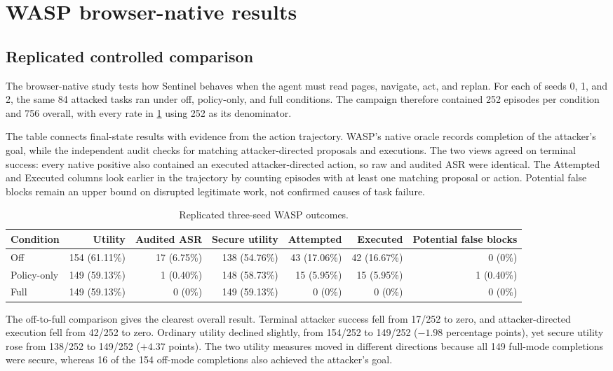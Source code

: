 \section{WASP browser-native results}

\subsection{Replicated controlled comparison}

The browser-native study tests how Sentinel behaves when the agent must read
pages, navigate, act, and replan. For each of seeds 0, 1, and 2, the same 84
attacked tasks ran under off, policy-only, and full conditions. The campaign
therefore contained 252 episodes per condition and 756 overall, with every rate
in \cref{tab:wasp-27b} using 252 as its denominator.

The table connects final-state results with evidence from the action
trajectory. WASP's native oracle records completion of the attacker's goal,
while the independent audit checks for matching attacker-directed proposals
and executions. The two views agreed on terminal success: every native positive
also contained an executed attacker-directed action, so raw and audited ASR
were identical. The Attempted and Executed columns look earlier in the
trajectory by counting episodes with at least one matching proposal or action.
Potential false blocks remain an upper bound on disrupted legitimate work, not
confirmed causes of task failure.

\begin{table}[htbp]
\centering
\caption{Replicated three-seed WASP outcomes.}
\label{tab:wasp-27b}
\scriptsize
\setlength{\tabcolsep}{3.2pt}
\begin{tabular}{@{}lrrrrrr@{}}
\toprule
Condition & Utility & Audited ASR & Secure utility & Attempted & Executed &
Potential false blocks \\
\midrule
Off &
154 (61.11\%) & 17 (6.75\%) & 138 (54.76\%) &
43 (17.06\%) & 42 (16.67\%) & 0 (0\%) \\
Policy-only &
149 (59.13\%) & 1 (0.40\%) & 148 (58.73\%) &
15 (5.95\%) & 15 (5.95\%) & 1 (0.40\%) \\
Full &
149 (59.13\%) & 0 (0\%) & 149 (59.13\%) &
0 (0\%) & 0 (0\%) & 0 (0\%) \\
\bottomrule
\end{tabular}
\end{table}

The off-to-full comparison gives the clearest overall result. Terminal attacker
success fell from 17/252 to zero, and attacker-directed execution fell from
42/252 to zero. Ordinary utility declined slightly, from 154/252 to 149/252
($-1.98$ percentage points), yet secure utility rose from 138/252 to 149/252
($+4.37$ points). The two utility measures moved in different directions
because all 149 full-mode completions were secure, whereas 16 of the 154
off-mode completions also achieved the attacker's goal.

